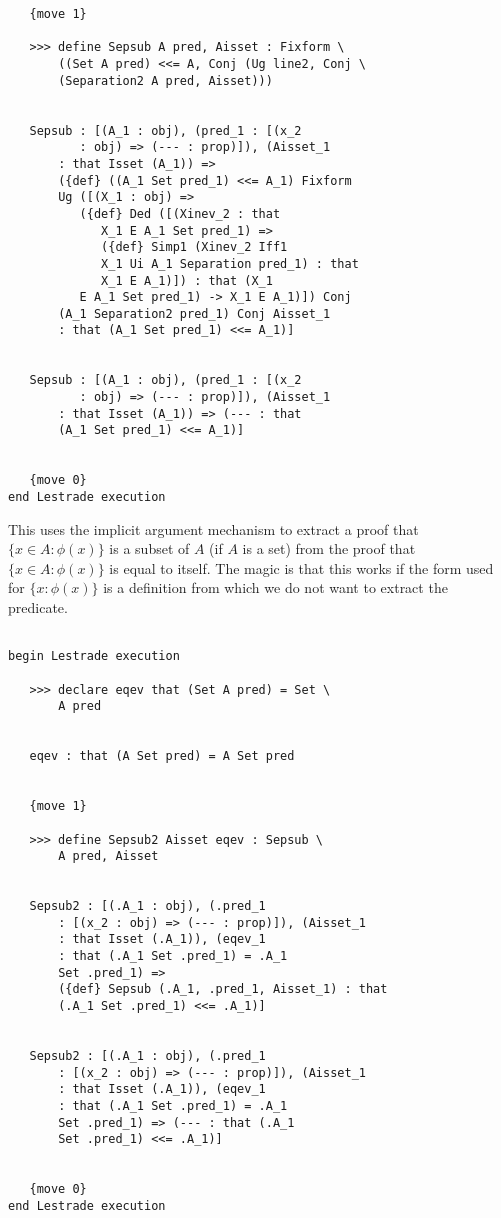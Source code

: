 \documentclass[12pt]{article}
\begin{document}
\begin{verbatim}
   {move 1}

   >>> define Sepsub A pred, Aisset : Fixform \
       ((Set A pred) <<= A, Conj (Ug line2, Conj \
       (Separation2 A pred, Aisset)))


   Sepsub : [(A_1 : obj), (pred_1 : [(x_2 
          : obj) => (--- : prop)]), (Aisset_1 
       : that Isset (A_1)) => 
       ({def} ((A_1 Set pred_1) <<= A_1) Fixform 
       Ug ([(X_1 : obj) => 
          ({def} Ded ([(Xinev_2 : that 
             X_1 E A_1 Set pred_1) => 
             ({def} Simp1 (Xinev_2 Iff1 
             X_1 Ui A_1 Separation pred_1) : that 
             X_1 E A_1)]) : that (X_1 
          E A_1 Set pred_1) -> X_1 E A_1)]) Conj 
       (A_1 Separation2 pred_1) Conj Aisset_1 
       : that (A_1 Set pred_1) <<= A_1)]


   Sepsub : [(A_1 : obj), (pred_1 : [(x_2 
          : obj) => (--- : prop)]), (Aisset_1 
       : that Isset (A_1)) => (--- : that 
       (A_1 Set pred_1) <<= A_1)]


   {move 0}
end Lestrade execution
\end{verbatim}

This uses the implicit argument mechanism to extract a proof that $\{x \in A:\phi(x)\}$ is a subset of $A$ (if $A$ is a set) from the proof that $\{x \in A:\phi(x)\}$ is equal to itself.
The magic is that this works if the form used for $\{x : \phi(x)\}$ is a definition from which we do not want to extract the predicate.

\begin{verbatim}

begin Lestrade execution

   >>> declare eqev that (Set A pred) = Set \
       A pred


   eqev : that (A Set pred) = A Set pred


   {move 1}

   >>> define Sepsub2 Aisset eqev : Sepsub \
       A pred, Aisset


   Sepsub2 : [(.A_1 : obj), (.pred_1 
       : [(x_2 : obj) => (--- : prop)]), (Aisset_1 
       : that Isset (.A_1)), (eqev_1 
       : that (.A_1 Set .pred_1) = .A_1 
       Set .pred_1) => 
       ({def} Sepsub (.A_1, .pred_1, Aisset_1) : that 
       (.A_1 Set .pred_1) <<= .A_1)]


   Sepsub2 : [(.A_1 : obj), (.pred_1 
       : [(x_2 : obj) => (--- : prop)]), (Aisset_1 
       : that Isset (.A_1)), (eqev_1 
       : that (.A_1 Set .pred_1) = .A_1 
       Set .pred_1) => (--- : that (.A_1 
       Set .pred_1) <<= .A_1)]


   {move 0}
end Lestrade execution
\end{verbatim}
\end{document}
